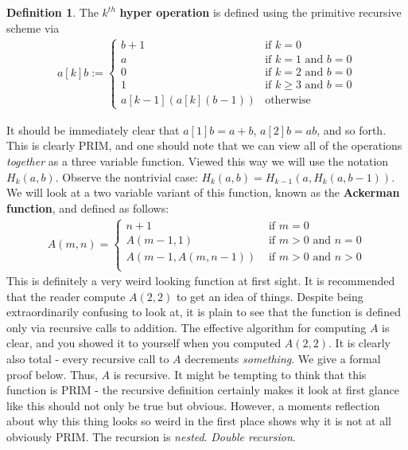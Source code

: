 \documentclass{article}
\theoremstyle{definition}
\newtheorem{definition}{Definition}[section]
\theoremstyle{plain}
\theoremstyle{theorem}
\begin{document}
\begin{definition}
	The $k^{th}$ \textbf{hyper operation} is defined using the primitive recursive scheme via
	\begin{align}
		a[k]b := \begin{cases}
								b+1 & \textrm{if } k=0 \\
								a	& \textrm{if } k=1 \textrm{ and } b=0 \\
								0	& \textrm{if } k=2 \textrm{ and } b=0 \\
								1	& \textrm{if } k \geq 3 \textrm{ and } b=0 \\
								a[k-1](a[k](b-1)) & \textrm{otherwise}
				\end{cases}
	\end{align}
\end{definition}
It should be immediately clear that $a[1]b = a+b$, $a[2]b = ab$, and so forth. This is clearly PRIM, and one should note that we can view all of the operations \textit{together} as a three variable function. Viewed this way we will use the notation $H_k(a,b)$. Observe the nontrivial case: $H_k(a,b) = H_{k-1}(a,H_k(a,b-1))$. We will look at a two variable variant of this function, known as the \textbf{Ackerman function}, and defined as follows:
\begin{align}
    A(m,n) = \begin{cases}
                n+1 & \textrm{ if $m = $0} \\
                A(m-1,1) & \textrm{ if $m>0$ and $n=0$} \\
                A(m-1,A(m,n-1)) & \textrm{ if $m>0$ and $n>0$} \\
             \end{cases}
\end{align}
This is definitely a very weird looking function at first sight. It is recommended that the reader compute $A(2,2)$ to get an idea of things. Despite being extraordinarily confusing to look at, it is plain to see that the function is defined only via recursive calls to addition. The effective algorithm for computing $A$ is clear, and you showed it to yourself when you computed $A(2,2)$. It is clearly also total - every recursive call to $A$ decrements \textit{something}. We give a formal proof below. Thus, $A$ is recursive. It might be tempting to think that this function is PRIM - the recursive definition certainly makes it look at first glance like this should not only be true but obvious. However, a moments reflection about why this thing looks so weird in the first place shows why it is not at all obviously PRIM. The recursion is \textit{nested}. \textit{Double recursion}. 
\end{document}
